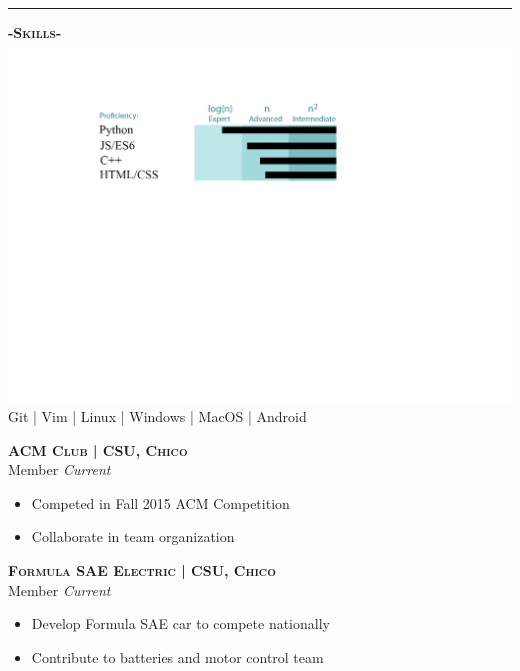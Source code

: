 \documentclass[12pt]{article}
\begin{document}
\noindent\rule{19cm}{0.4pt}
\bigskip
\begin{multicols}{2}
\begin{center}
\textbf{\textsc{-Skills-}}
\includegraphics[trim={2.8cm 7cm 2cm 2cm},clip]{ResumePic}
\smallskip
Git | Vim | Linux | Windows | MacOS | Android
\end{center}

\columnbreak

\center
\footnotesize
\color{black}\textsc{\textbf{ACM Club | CSU, Chico}}\\

\color{Cerulean}Member \hfill \color{gray}\textit{Current}\\
\begin{itemize}
\setlength{\itemsep}{0pt}
	\item Competed in Fall 2015 ACM Competition
	\item Collaborate in team organization
\end{itemize}

\center
\color{black}\textsc{\textbf{Formula SAE Electric | CSU, Chico}}\\
\color{Cerulean}Member \hfill \color{gray}\textit{Current}

\begin{itemize}
\setlength{\itemsep}{0pt}
	\item Develop Formula SAE car to compete nationally
	\item Contribute to batteries and motor control team
\end{itemize}


\end{multicols}
\end{document}
